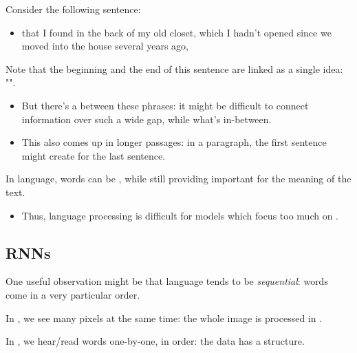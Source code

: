     \miniex Consider the following sentence: 

    \begin{itemize}
        \item {} that I found in the back of my old closet, which I hadn't opened since we moved into the house several years ago, 
    \end{itemize}

    \phantom{}

    Note that the beginning and the end of this sentence are linked as a single idea: "".

    \begin{itemize}
        \item But there's a  between these phrases: it might be difficult to connect information over such a wide gap, while  what's in-between. 

        \item This also comes up in longer passages: in a paragraph, the first sentence might create  for the last sentence.\\
           
    \end{itemize}

    \begin{concept}
        In language, words can be , while still providing important  for the meaning of the text.

        \begin{itemize}
            \item Thus, language processing is difficult for models which focus too much on .
        \end{itemize}
    \end{concept}

\phantom{}

\subsection{RNNs}

    One useful observation might be that language tends to be \textit{sequential}: words come in a very particular order.\\

    \begin{concept}
        In , we see many pixels at the same time: the whole image is processed in .

        In , we hear/read words one-by-one, in order: the data has a  structure.
    \end{concept}


